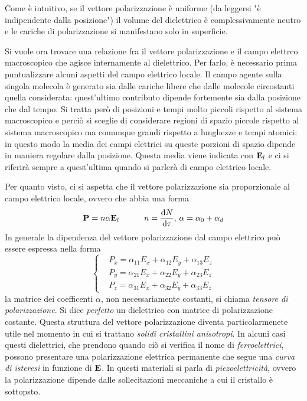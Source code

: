 Come è intuitivo, se il vettore polarizzazione è uniforme (da leggersi "è indipendente dalla posizione") il volume del dielettrico
è complessivamente neutro e le cariche di polarizzazione si manifestano solo in superficie.

Si vuole ora trovare una relazione fra il vettore polarizzazione e il campo elettrco macroscopico che agisce internamente al dielettrico.
Per farlo, è necessario prima puntualizzare alcuni aspetti del campo elettrico locale.
Il campo agente sulla singola molecola è generato sia dalle cariche libere che dalle molecole circostanti quella considerata:
quest'ultimo contributo dipende fortemente sia dalla posizione che dal tempo.
Si tratta però di posizioni e tempi molto piccoli rispetto al sistema macroscopico
e perciò si sceglie di considerare regioni di spazio piccole rispetto al sistema macroscopico
ma comunque grandi rispetto a lunghezze e tempi atomici: in questo modo la media dei campi elettrici
su queste porzioni di spazio dipende in maniera regolare dalla posizione.
Questa media viene indicata con $\vb{E}_l$ e ci si riferirà sempre a quest'ultima
quando si parlerà di campo elettrico locale.


Per quanto visto, ci si aspetta che il vettore polarizzazione sia proporzionale al campo elettrico locale, ovvero che abbia una forma
\[
    \vb{P}=n\alpha\vb{E}_l \quad\quad\quad n=\dv{N}{\tau},\,\alpha=\alpha_0+\alpha_d
\]
In generale la dipendenza del vettore polarizzazione dal campo elettrico può essere espressa nella forma
\[
    \begin{cases}
        &  P_x=\alpha_{11}E_x+\alpha_{12}E_y+\alpha_{13}E_z \\
        &  P_y=\alpha_{21}E_x+\alpha_{22}E_y+\alpha_{23}E_z \\
        &  P_z=\alpha_{31}E_x+\alpha_{32}E_y+\alpha_{33}E_z
    \end{cases}
\]
la matrice dei coefficenti $\alpha$, non necessariamente costanti, si chiama \textit{tensore di polarizzazione}.
Si dice \textit{perfetto} un dielettrico con matrice di polarizzazione costante.
Questa struttura del vettore polarizzazione diventa particolarmenete utile
nel momento in cui si trattano \textit{solidi cristallini anisotropi}. In alcuni casi questi dielettrici,
che prendono quando ciò si verifica il nome di \textit{ferroelettrici}, possono presentare una polarizzazione elettrica permanente
che segue una \textit{curva di isteresi} in funzione di $\vb{E}$.
In questi materiali si parla di \textit{piezoelettricità}, ovvero la polarizzazione
dipende dalle sollecitazioni meccaniche a cui il cristallo è sottopsto.

